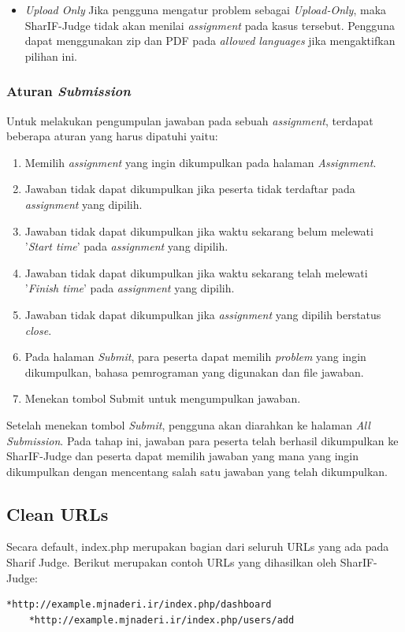 \begin{itemize}
    \item \textit{Upload Only} \newline
    Jika pengguna mengatur problem sebagai \textit{Upload-Only}, maka SharIF-Judge tidak akan menilai \textit{assignment} pada kasus tersebut. Pengguna dapat menggunakan zip dan PDF pada \textit{allowed languages} jika mengaktifkan pilihan ini.
\end{itemize}

\subsubsection{Aturan \textit{Submission}}
\label{sec: Aturan Submission}
Untuk melakukan pengumpulan jawaban pada sebuah \textit{assignment}, terdapat beberapa aturan yang harus dipatuhi yaitu:
\begin{enumerate}
    \item Memilih \textit{assignment} yang ingin dikumpulkan pada halaman \textit{Assignment}.
    \item Jawaban tidak dapat dikumpulkan jika peserta tidak terdaftar pada \textit{assignment} yang dipilih.
    \item Jawaban tidak dapat dikumpulkan jika waktu sekarang belum melewati ’\textit{Start time}’ pada \textit{assignment} yang dipilih.
    \item Jawaban tidak dapat dikumpulkan jika waktu sekarang telah melewati ’\textit{Finish time}’ pada \textit{assignment} yang dipilih.
    \item Jawaban tidak dapat dikumpulkan jika \textit{assignment} yang dipilih berstatus \textit{close}.
    \item Pada halaman \textit{Submit}, para peserta dapat memilih \textit{problem} yang ingin dikumpulkan, bahasa pemrograman yang digunakan dan file jawaban.
    \item Menekan tombol Submit untuk mengumpulkan jawaban.
\end{enumerate}
    Setelah menekan tombol \textit{Submit}, pengguna akan diarahkan ke halaman \textit{All Submission}. Pada tahap ini, jawaban para peserta telah berhasil dikumpulkan ke SharIF-Judge dan peserta dapat memilih jawaban yang mana yang ingin dikumpulkan dengan mencentang salah satu jawaban yang telah dikumpulkan.

\subsection{Clean URLs}
\label{sec: Clean URLs}
Secara default, index.php merupakan bagian dari seluruh URLs yang ada pada Sharif Judge. Berikut merupakan contoh URLs yang dihasilkan oleh SharIF-Judge:
 \begin{lstlisting}[basicstyle=\ttfamily, frame=single,
    columns=fullflexible, breaklines=true, numbers=none]
    *http://example.mjnaderi.ir/index.php/dashboard
    *http://example.mjnaderi.ir/index.php/users/add
    \end{lstlisting}
    
